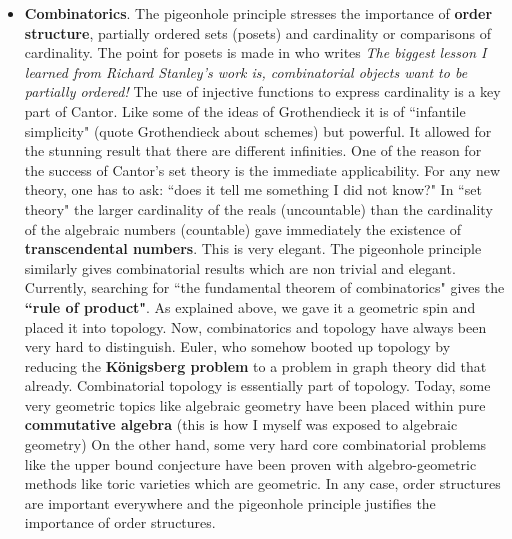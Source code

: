 \documentclass[12pt]{amsart}
\begin{document}
\begin{itemize}
\item {\bf Combinatorics}. The pigeonhole principle stresses the importance of 
{\bf order structure}, partially ordered sets (posets) and cardinality or comparisons of cardinality. 
The point for posets is made in \cite{JamesPropp} who writes 
{\it The biggest lesson I learned from Richard Stanley's work is, combinatorial objects want to be partially ordered!}
The use of injective functions to express cardinality is a key part of Cantor. 
Like some of the ideas of Grothendieck it is of ``infantile simplicity" (quote Grothendieck about schemes) 
but powerful.  It allowed for the stunning result that there are different infinities. One of the
reason for the success of Cantor's set theory is the immediate applicability. For any new theory,
one has to ask: ``does it tell me something I did not know?" In ``set theory" the larger cardinality
of the reals (uncountable) than the cardinality of the algebraic numbers (countable) gave immediately
the existence of {\bf transcendental numbers}. This is very elegant. The pigeonhole principle 
similarly gives combinatorial results which are non trivial and elegant. 
Currently, searching for ``the fundamental theorem of combinatorics" gives the {\bf ``rule of product"}.
As explained above, we gave it a geometric spin and placed it into topology. Now, combinatorics and 
topology have always been very hard to distinguish. Euler, who somehow booted up topology by reducing the 
{\bf K\"onigsberg problem} to a problem in graph theory did that already. Combinatorial topology is
essentially part of topology. Today, some very geometric topics like algebraic geometry
have been placed within pure {\bf commutative algebra} (this is how I myself was exposed to algebraic geometry)
On the other hand, some very hard core combinatorial problems like the upper bound conjecture have been 
proven with algebro-geometric methods like toric varieties which are geometric. In any case, 
order structures are important everywhere and the pigeonhole principle justifies the importance of order structures.


\end{itemize}
\end{document}
